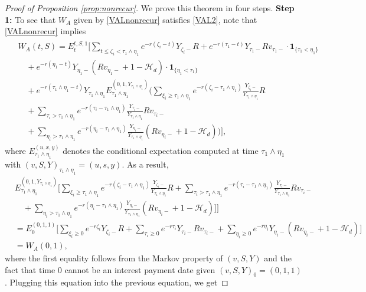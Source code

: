 \documentclass[final,pdftex]{ectaart}
\theoremstyle{plain}
\begin{document}
\begin{appendices}
\begin{proof}[Proof of Proposition \ref{prop:nonrecur}]
	We prove this theorem in four steps.
	{\flushleft\bf Step 1:} To see that $W_A$ given by \eqref{VALnonrecur} satisfies \eqref{VAL2}, note that \eqref{VALnonrecur} implies
	\begin{align*}
	\begin{split}
	&W_A(t,S)=E_t^{t,S,1}\Bigg[\sum_{t\le\zeta_i<\tau_1\land\eta_1}e^{-r(\zeta_i-t)}Y_{\zeta_i-}R+e^{-r(\tau_1-t)}Y_{\tau_1-}Rv_{\tau_1-}\cdot\mathbf{1}_{\{\tau_1<\eta_1\}}\\
	&\quad+e^{-r(\eta_1-t)}Y_{\eta_1-}(Rv_{\eta_1-}+1-\mathcal{H}_d)\cdot\mathbf{1}_{\{\eta_1<\tau_1\}}\\
	&\quad+e^{-r(\tau_1\land\eta_1-t)}Y_{\tau_1\land\eta_1}E_{\tau_1\land\eta_1}^{(0,1,Y_{\tau_1\land\eta_1})}\Bigg(\sum_{\xi_i\ge\tau_1\land\eta_1}e^{-r(\zeta_i-\tau_1\land\eta_1)}\frac{Y_{\zeta_i-}}{Y_{\tau_1\land\eta_1}}R\\
	&\quad+\sum_{\tau_i>\tau_1\land\eta_1}e^{-r(\tau_i-\tau_1\land\eta_1)}\frac{Y_{\tau_i-}}{Y_{\tau_1\land\eta_1}}Rv_{\tau_i-}\\
	&\quad+\sum_{\eta_i>\tau_1\land\eta_1}e^{-r(\eta_i-\tau_1\land\eta_1)}\frac{Y_{\eta_i-}}{Y_{\tau_1\land\eta_1}}(Rv_{\eta_i-}+1-\mathcal{H}_d)\Bigg)\Bigg],
	\end{split}
	\end{align*}
	where $E_{\tau_1\land\eta_1}^{(u,x,y)}$ denotes the conditional expectation computed at time $\tau_1\land\eta_1$ with $(v,S,Y)_{\tau_1\land\eta_1}=(u,s,y)$. As a result,
	\begin{align*}
	 &E_{\tau_1\land\eta_1}^{(0,1,Y_{\tau_1\land\eta_1})}\Bigg[\sum_{\xi_i\ge\tau_1\land\eta_1}e^{-r(\zeta_i-\tau_1\land\eta_1)}\frac{Y_{\zeta_i-}}{Y_{\tau_1\land\eta_1}}R+\sum_{\tau_i>\tau_1\land\eta_1}e^{-r(\tau_i-\tau_1\land\eta_1)}\frac{Y_{\tau_i-}}{Y_{\tau_1\land\eta_1}}Rv_{\tau_i-}\\
	&\quad+\sum_{\eta_i>\tau_1\land\eta_1}e^{-r(\eta_i-\tau_1\land\eta_1)}\frac{Y_{\eta_i-}}{Y_{\tau_1\land\eta_1}}(Rv_{\eta_i-}+1-\mathcal{H}_d)\Bigg]\Bigg]\\
	&=E_{0}^{(0,1,1)}\Bigg[\sum_{\xi_i\ge0}e^{-r\zeta_i}Y_{\zeta_i-}R+\sum_{\tau_i\ge0}e^{-r\tau_i}Y_{\tau_i-}Rv_{\tau_i-}+\sum_{\eta_i\ge0}e^{-r\eta_i}Y_{\eta_i-}(Rv_{\eta_i-}+1-\mathcal{H}_d)\Bigg]\\
	&=W_A(0,1),
	\end{align*}
	where the first equality follows from the Markov property of $(v,S,Y)$ and the fact that time 0 cannot be an interest payment date given $(v,S,Y)_0=(0,1,1)$. Plugging this equation into the previous equation, we get

\end{proof}
\end{appendices}
\end{document}
